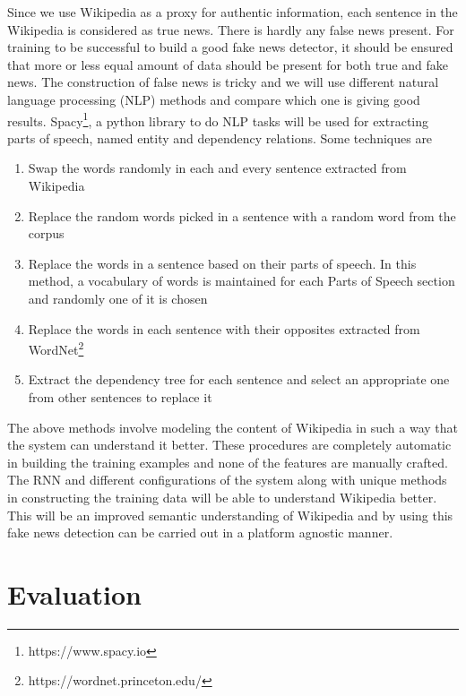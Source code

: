 \documentclass[a4paper, 11pt]{article}
\begin{document}
Since we use Wikipedia as a proxy for authentic information, each sentence in the Wikipedia is considered as true news. There is hardly any false news present. For training to be successful to build a good fake news detector, it should be ensured that more or less equal amount of data should be present for both true and fake news. The construction of false news is tricky and we will use different natural language processing (NLP) methods and compare which one is giving good results. Spacy\footnote{https://www.spacy.io}, a python library to do NLP tasks will be used for extracting parts of speech, named entity and dependency relations. Some techniques are 
\begin{enumerate}
\item Swap the words randomly in each and every sentence extracted from Wikipedia
\item Replace the random words picked in a sentence with a random word from the corpus
\item Replace the words in a sentence based on their parts of speech. In this method, a vocabulary of words is maintained for each Parts of Speech section and randomly one of it is chosen
\item Replace the words in each sentence with their opposites extracted from WordNet\footnote{https://wordnet.princeton.edu/}
\item Extract the dependency tree for each sentence and select an appropriate one from other sentences to replace it
\end{enumerate}


The above methods involve modeling the content of Wikipedia in such a way that the system can understand it better. These procedures are completely automatic in building the training examples and none of the features are manually crafted. The RNN and different configurations of the system along with unique methods in constructing the training data will be able to understand Wikipedia better. This will be an improved semantic understanding of Wikipedia and by using this fake news detection can be carried out in a platform agnostic manner. 

\section{Evaluation}
\end{document}
